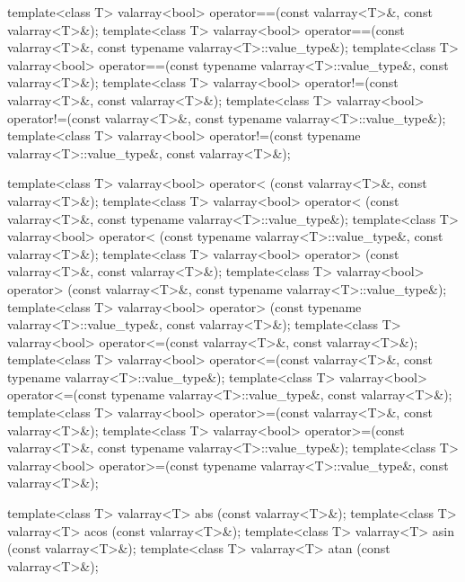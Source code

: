 \begin{codeblock}
{  template<class T> valarray<bool> operator==(const valarray<T>&, const valarray<T>&);
  template<class T> valarray<bool> operator==(const valarray<T>&,
                                              const typename valarray<T>::value_type&);
  template<class T> valarray<bool> operator==(const typename valarray<T>::value_type&,
                                              const valarray<T>&);
  template<class T> valarray<bool> operator!=(const valarray<T>&, const valarray<T>&);
  template<class T> valarray<bool> operator!=(const valarray<T>&,
                                              const typename valarray<T>::value_type&);
  template<class T> valarray<bool> operator!=(const typename valarray<T>::value_type&,
                                              const valarray<T>&);

  template<class T> valarray<bool> operator< (const valarray<T>&, const valarray<T>&);
  template<class T> valarray<bool> operator< (const valarray<T>&,
                                              const typename valarray<T>::value_type&);
  template<class T> valarray<bool> operator< (const typename valarray<T>::value_type&,
                                              const valarray<T>&);
  template<class T> valarray<bool> operator> (const valarray<T>&, const valarray<T>&);
  template<class T> valarray<bool> operator> (const valarray<T>&,
                                              const typename valarray<T>::value_type&);
  template<class T> valarray<bool> operator> (const typename valarray<T>::value_type&,
                                              const valarray<T>&);
  template<class T> valarray<bool> operator<=(const valarray<T>&, const valarray<T>&);
  template<class T> valarray<bool> operator<=(const valarray<T>&,
                                              const typename valarray<T>::value_type&);
  template<class T> valarray<bool> operator<=(const typename valarray<T>::value_type&,
                                              const valarray<T>&);
  template<class T> valarray<bool> operator>=(const valarray<T>&, const valarray<T>&);
  template<class T> valarray<bool> operator>=(const valarray<T>&,
                                              const typename valarray<T>::value_type&);
  template<class T> valarray<bool> operator>=(const typename valarray<T>::value_type&,
                                              const valarray<T>&);

  template<class T> valarray<T> abs  (const valarray<T>&);
  template<class T> valarray<T> acos (const valarray<T>&);
  template<class T> valarray<T> asin (const valarray<T>&);
  template<class T> valarray<T> atan (const valarray<T>&);

}
\end{codeblock}
